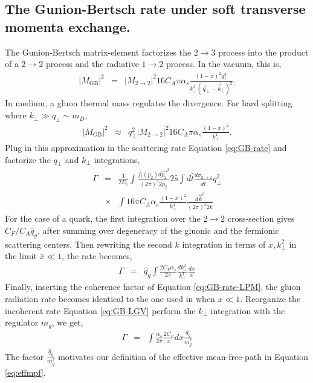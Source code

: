 \documentclass[aps, prc, reprint, amsmath, groupedaddress, nofootinbib]{revtex4-1}
\begin{document}
{\begin{appendices}
\section{The Gunion-Bertsch rate under soft transverse momenta exchange.}
\label{app:consistency}
The Gunion-Bertsch matrix-element factorizes the $2\rightarrow3$ process into the product of a $2\rightarrow2$ process and the radiative $1\rightarrow 2$ process. 
In the vacuum, this is,
\begin{eqnarray}
|M_{\textrm{GB}}|^2 &=& |M_{2\rightarrow 2}|^2 16 C_A \pi \alpha_s \frac{(1-\bar{x})^2q_\perp^2}{k_\perp^2\left(\vec{q}_\perp-\vec{k}_\perp\right)^2}.
\end{eqnarray}
In medium, a gluon thermal mass regulates the divergence. 
For hard splitting where $k_\perp \gg q_\perp \sim m_D$, 
\begin{eqnarray}
|M_{\textrm{GB}}|^2 &\approx & q_\perp^2 |M_{2\rightarrow 2}|^2 16 C_A \pi \alpha_s \frac{(1-\bar{x})^2}{k_\perp^4}.
\end{eqnarray}
Plug in this approximation in the scattering rate Equation \ref{eq:GB-rate} and factorize the $q_\perp$ and $k_\perp$ integrations,
\begin{eqnarray}
\Gamma &=& \frac{1}{2E_1}\int\frac{f_i(p_2)d\vec{p_2}^3}{(2\pi)^3 2p_2}2\hat{s}\int d\hat{t}\frac{d\sigma_{2\rightarrow 2}}{d\hat{t}}q_\perp^2
\nonumber \\
&\times& \int 16\pi C_A \alpha_s \frac{(1-\bar{x})^2}{k_\perp^4} \frac{d\vec{k}^3}{(2\pi)^3 2k}
\end{eqnarray}
For the case of a quark, the first integration over the $2\rightarrow 2$ cross-section gives $C_F/C_A\hat{q}_g$, after summing over degeneracy of the gluonic and the fermionic scattering centers.
Then rewriting the second $k$ integration in terms of $x, k_\perp^2$ in the limit $\bar{x}\ll 1$, the rate becomes,
\begin{eqnarray}\label{eq:GB-LGV}
\Gamma &=& \hat{q}_g \int \frac{2C_F\alpha_s}{2\pi} \frac{dk_\perp^2}{k_\perp^4} \frac{dx}{x}
\end{eqnarray}
Finally, inserting the coherence factor of Equation \ref{eq:GB-rate-LPM}, the gluon radiation rate becomes identical to the one used in \cite{Cao:2013ita} when $x\ll 1$.
Reorganize the incoherent rate Equation \ref{eq:GB-LGV} perform the $k_\perp$ integration with the regulator $m_g$, we get,
\begin{eqnarray}
\Gamma &=& \int \frac{\alpha_s}{2\pi} \frac{2C_F}{x}dx \frac{q_g}{m_g^2} 
\end{eqnarray}
The factor $\frac{\hat{q}_g}{m_g^2}$ motivates our definition of the effective mean-free-path in Equation \ref{eq:effmpf}.


\end{appendices}}
\end{document}
